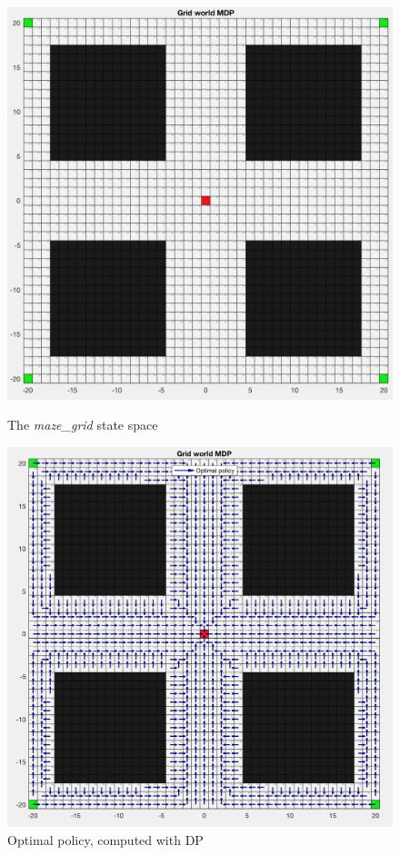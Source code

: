 \documentclass[a4paper]{report}
\begin{document}
{{			\begin{figure}[ht!]
				\begin{minipage}{0.45\linewidth}
					\includegraphics[width=\linewidth]{maze_grid}
					\caption{The \emph{maze\_grid} state space}
					\label{fig::maze_display}
				\end{minipage}
				\hfill
				\begin{minipage}{0.45\linewidth}
					\includegraphics[width=\linewidth]{maze_optimal_policy}
					\caption{Optimal policy, computed with DP}
					\label{fig::maze_optimal_policy}
				\end{minipage}
			\end{figure}
				
}}
\end{document}
